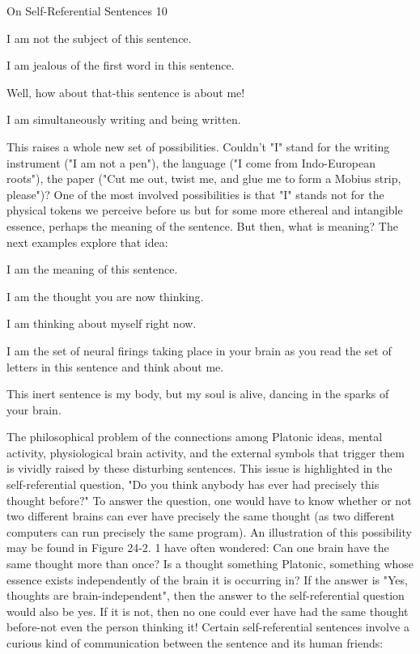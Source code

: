 On Self-Referential Sentences                                                              10

       I am not the subject of this sentence.

       I am jealous of the first word in this sentence.

       Well, how about that-this sentence is about me!

       I am simultaneously writing and being written.

This raises a whole new set of possibilities. Couldn't "I" stand for the writing instrument
("I am not a pen"), the language ("I come from Indo-European roots"), the paper ("Cut
me out, twist me, and glue me to form a Mobius strip, please")? One of the most involved
possibilities is that "I" stands not for the physical tokens we perceive before us but for
some more ethereal and intangible essence, perhaps the meaning of the sentence. But
then, what is meaning? The next examples explore that idea:

  I am the meaning of this sentence.

  I am the thought you are now thinking.

  I am thinking about myself right now.

  I am the set of neural firings taking place in your brain as you read the set of letters
     in this sentence and think about me.

  This inert sentence is my body, but my soul is alive, dancing in the sparks of your
    brain.

The philosophical problem of the connections among Platonic ideas, mental activity,
physiological brain activity, and the external symbols that trigger them is vividly raised
by these disturbing sentences.
        This issue is highlighted in the self-referential question, "Do you think anybody
has ever had precisely this thought before?" To answer the question, one would have to
know whether or not two different brains can ever have precisely the same thought (as
two different computers can run precisely the same program). An illustration of this
possibility may be found in Figure 24-2. 1 have often wondered: Can one brain have the
same thought more than once? Is a thought something Platonic, something whose essence
exists independently of the brain it is occurring in? If the answer is "Yes, thoughts are
brain-independent", then the answer to the self-referential question would also be yes. If
it is not, then no one could ever have had the same thought before-not even the person
thinking it!
        Certain self-referential sentences involve a curious kind of communication
between the sentence and its human friends:




